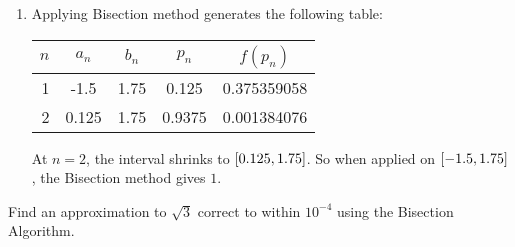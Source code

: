 \documentclass[../../../../Assignments.tex]{subfiles}
\begin{document}
\begin{solution}
\begin{enumerate}[label = (\alph*)]
        \item Applying Bisection method generates the following table:

            \begin{table}[H]
                \centering
                \begin{tabular}{r S[table-format=-1.3] S[table-format=1.2] S[table-format=1.4] S[table-format=1.9]}
                    \toprule
                    \(n\)  &   {\(a_n\)}   &   {\(b_n\)}   &   {\(p_n\)}   &  {\(f(p_n)\)}  \\
                      &  -1.5         & 1.75          &  0.125        &  0.375359058   \\
                        2  &   0.125       & 1.75          &  0.9375       &  0.001384076   \\
                    \bottomrule
                \end{tabular}
            \end{table}

            At \(n = 2\), the interval shrinks to
            \(\interval{\num{0.125}}{\num{1.75}}\). So when applied on
            \(\interval{\num{-1.5}}{\num{1.75}}\), the Bisection method gives
            \(1\).
    \end{enumerate}
\end{solution}

\begin{exercise}
    Find an approximation to \(\sqrt{3}\) correct to within \(10^{-4}\) using
    the Bisection Algorithm.
\end{exercise}
\end{document}
